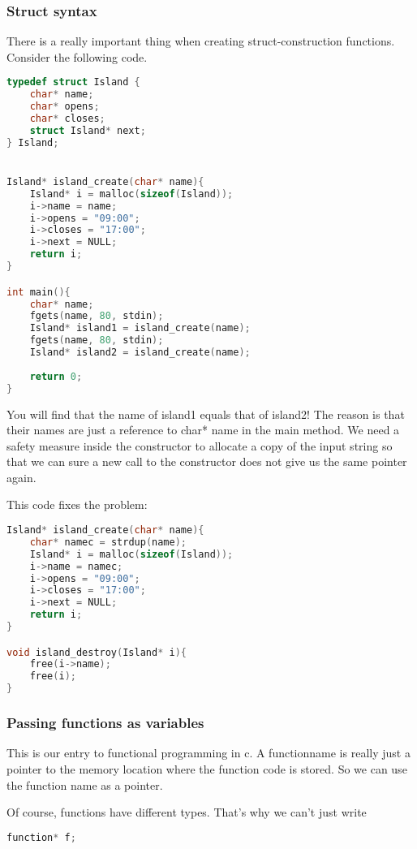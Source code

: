 \subsubsection{Struct syntax}

There is a really important thing when creating struct-construction functions.
Consider the following code. 

\begin{lstlisting}[language=c]
typedef struct Island {
	char* name;
	char* opens;
	char* closes;
	struct Island* next;
} Island;


Island* island_create(char* name){
	Island* i = malloc(sizeof(Island));
	i->name = name;
	i->opens = "09:00";
	i->closes = "17:00";
	i->next = NULL;
	return i;
}

int main(){
    char* name;
    fgets(name, 80, stdin);
    Island* island1 = island_create(name);
    fgets(name, 80, stdin);
    Island* island2 = island_create(name);
    
    return 0;
}
\end{lstlisting}

You will find that the name of island1 equals that of island2!
The reason is that their names are just a reference to char* name in the main method. 
We need a safety measure inside the constructor to allocate a copy of the input string so that we can sure a new call to the constructor does not give us the same pointer again.

This code fixes the problem: 

\begin{lstlisting}[language=c]
Island* island_create(char* name){
    char* namec = strdup(name);
	Island* i = malloc(sizeof(Island));
	i->name = namec;
	i->opens = "09:00";
	i->closes = "17:00";
	i->next = NULL;
	return i;
}

void island_destroy(Island* i){
    free(i->name);
    free(i);
}
\end{lstlisting}



\subsubsection{Passing functions as variables}

This is our entry to functional programming in c.
A functionname is really just a pointer to the memory location where the function code is stored. So we can use the function name as a pointer.

Of course, functions have different types. That's why we can't just write 
\begin{lstlisting}[language=c]
function* f;
\end{lstlisting}

